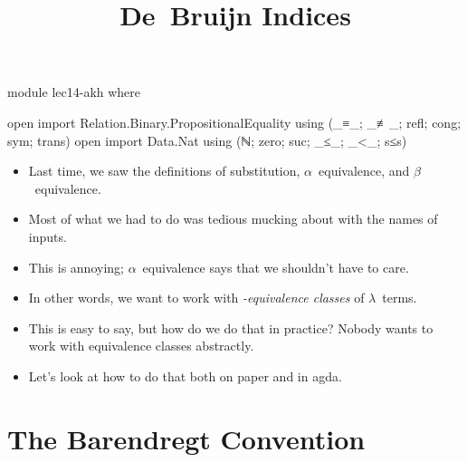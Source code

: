 \documentclass{lecturenotes}
\title{De~Bruijn Indices}
\begin{document}
\maketitle

\begin{code}[hide]
module lec14-akh where

open import Relation.Binary.PropositionalEquality using (_≡_; _≢_; refl; cong; sym; trans)
open import Data.Nat using (ℕ; zero; suc; _≤_; _<_; s≤s)
\end{code}

\begin{itemize}
\item Last time, we saw the definitions of substitution, $\alpha$~equivalence, and $\beta$~equivalence.
\item Most of what we had to do was tedious mucking about with the names of inputs.
\item This is annoying; $\alpha$~equivalence says that we shouldn't have to care.
\item In other words, we want to work with \emph{\alpha-equivalence classes} of $\lambda$~terms.
\item This is easy to say, but how do we do that in practice?
  Nobody wants to work with equivalence classes abstractly.
\item Let's look at how to do that both on paper and in agda.
\end{itemize}

\section{The Barendregt Convention}
\label{sec:barendr-conv}
\end{document}
